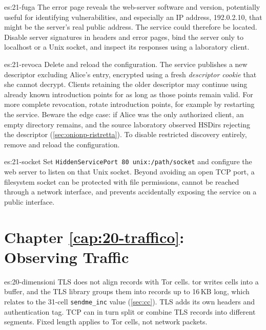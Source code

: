 \begin{soluzione}{es:21-fuga}
The error page reveals the web-server software and version, potentially useful for identifying vulnerabilities, and especially an IP address, 192.0.2.10, that might be the server's real public address. The service could therefore be located. Disable server signatures in headers and error pages, bind the server only to localhost or a Unix socket, and inspect its responses using a laboratory client.
\end{soluzione}

\begin{soluzione}{es:21-revoca}
Delete  and reload the configuration. The service publishes a new descriptor excluding Alice's entry, encrypted using a fresh \emph{descriptor cookie} that she cannot decrypt. Clients retaining the older descriptor may continue using already known introduction points for as long as those points remain valid. For more complete revocation, rotate introduction points, for example by restarting the service. Beware the edge case: if Alice was the only authorized client, an empty directory remains, and the source laboratory observed HSDirs rejecting the descriptor (\cref{sec:onionp-ristretta}). To disable restricted discovery entirely, remove  and reload the configuration. \end{soluzione}

\begin{soluzione}{es:21-socket}
Set \texttt{HiddenServicePort 80 unix:/path/socket} and configure the web server to listen on that Unix socket. Beyond avoiding an open TCP port, a filesystem socket can be protected with file permissions, cannot be reached through a network interface, and prevents accidentally exposing the service on a public interface.
\end{soluzione}

\section*{Chapter \ref{cap:20-traffico}: Observing Traffic}

\begin{soluzione}{es:20-dimensioni}
TLS does not align records with Tor cells. tor writes cells into a buffer, and the TLS library groups them into records up to 16\,KB long, which relates to the 31-cell \texttt{sendme\_inc} value (\cref{sec:cc}). TLS adds its own headers and authentication tag. TCP can in turn split or combine TLS records into different segments. Fixed length applies to Tor cells, not network packets.
\end{soluzione}

